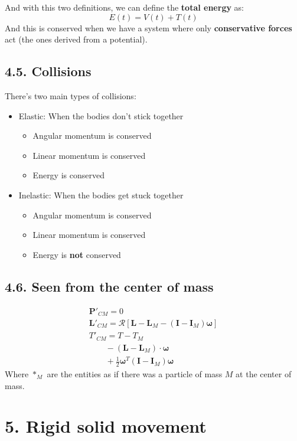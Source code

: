 \documentclass[a4paper,landscape,10pt]{cheatsheet}
\begin{document}
And with this two definitions, we can define the \textbf{total energy} as:
$$
E(t) = V(t) + T(t)
$$
And this is conserved when we have a system where only \textbf{conservative forces} act (the ones derived from a
potential).

\subsection*{4.5. Collisions}
There's two main types of collisions:
\begin{itemize}
  \item Elastic: When the bodies don't stick together
  \begin{itemize}
    \item Angular momentum is conserved
    \item Linear momentum is conserved
    \item Energy is conserved
  \end{itemize}
  \item Inelastic: When the bodies get stuck together
  \begin{itemize}
    \item Angular momentum is conserved
    \item Linear momentum is conserved
    \item Energy is \textbf{not} conserved
  \end{itemize}
\end{itemize}
\subsection*{4.6. Seen from the center of mass}
\begin{gather*}
  \textbf{P}'_{CM} = 0 \\
  \textbf{L}'_{CM} = \mathcal{R}\left[\textbf{L} - \textbf{L}_M - \left(\textbf{I} - \textbf{I}_M\right)\boldsymbol{\omega}\right] \\
  T'_{CM} = T - T_M \\
  \qquad - (\textbf{L}-\textbf{L}_M)\cdot\boldsymbol{\omega} \\
  \qquad + \frac{1}{2}\boldsymbol{\omega}^T(\textbf{I} - \textbf{I}_M)\boldsymbol{\omega}
\end{gather*}
Where $*_M$ are the entities as if there was a particle of mass $M$ at the center of mass.

\section*{5. Rigid solid movement}
\end{document}
